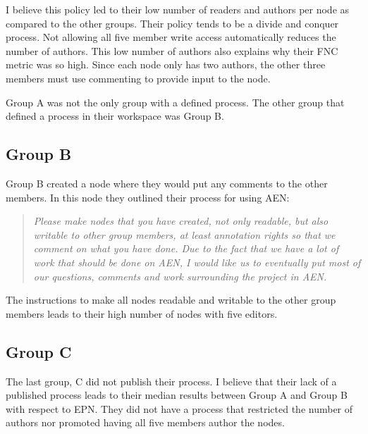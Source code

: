 I believe this policy led to their low number of readers and authors per
node as compared to the other groups.  Their policy tends to be a divide
and conquer process.  Not allowing all five member write access
automatically reduces the number of authors.  This low number of authors
also explains why their FNC metric was so high.  Since each node only has
two authors, the other three members must use commenting to provide input
to the node.

Group A was not the only group with a defined process.  The other group
that defined a process in their workspace was Group B.

\subsection{Group B}

Group B created a node where they would put any comments to the other
members.  In this node they outlined their process for using AEN:
\begin{quote}
  {\em
  Please make nodes that you have created, not only readable, but also
  writable to other group members, at least annotation rights so that we
  comment on what you have done.  Due to the fact that we have a lot of
  work that should be done on AEN, I would like us to eventually put most
  of our questions, comments and work surrounding the project in AEN.
  }
\end{quote}

The instructions to make all nodes readable and writable to the other group
members leads to their high number of nodes with five editors.

\subsection{Group C}

The last group, C did not publish their process.  I believe that their lack
of a published process leads to their median results between Group A and
Group B with respect to EPN.  They did not have a process that restricted
the number of authors nor promoted having all five members author the
nodes.




